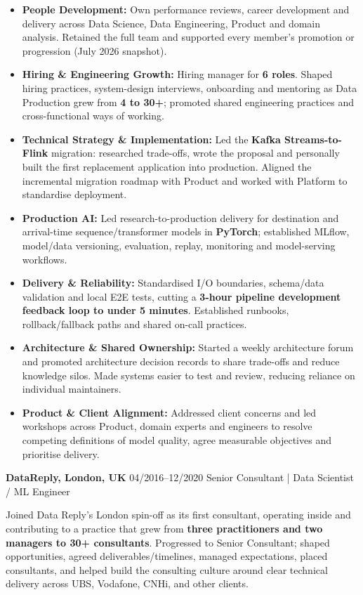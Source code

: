 \documentclass[]{../../../../friggeri-cv}
\renewcommand{\entry}[4]{%
  \parbox[t]{\dimexpr\textwidth-\entryleftinset\relax}{%
    \textbf{#2}%
    {\footnotesize\addfontfeature{Color=lightgray}\hspace{0.6em}#1}%
    \hfill%
    {\small\color{textcolor} #3}\\%
    #4\vspace{\parsep}%
  }\\}
\begin{document}
\begin{entrylist}
{{        }
        \begin{itemize}[leftmargin=1.1em]
            \item \footnotesize\textbf{People Development:} Own performance reviews, career development and delivery across Data Science, Data Engineering, Product and domain analysis. Retained the full team and supported every member's promotion or progression (July 2026 snapshot).
            \item \footnotesize\textbf{Hiring \& Engineering Growth:} Hiring manager for \textbf{6 roles}. Shaped hiring practices, system-design interviews, onboarding and mentoring as Data Production grew from \textbf{4 to 30+}; promoted shared engineering practices and cross-functional ways of working.
            \item \footnotesize\textbf{Technical Strategy \& Implementation:} Led the \textbf{Kafka Streams-to-Flink} migration: researched trade-offs, wrote the proposal and personally built the first replacement application into production. Aligned the incremental migration roadmap with Product and worked with Platform to standardise deployment.
            \item \footnotesize\textbf{Production AI:} Led research-to-production delivery for destination and arrival-time sequence/transformer models in \textbf{PyTorch}; established MLflow, model/data versioning, evaluation, replay, monitoring and model-serving workflows.
            \item \footnotesize\textbf{Delivery \& Reliability:} Standardised I/O boundaries, schema/data validation and local E2E tests, cutting a \textbf{3-hour pipeline development feedback loop to under 5 minutes}. Established runbooks, rollback/fallback paths and shared on-call practices.
            \item \footnotesize\textbf{Architecture \& Shared Ownership:} Started a weekly architecture forum and promoted architecture decision records to share trade-offs and reduce knowledge silos. Made systems easier to test and review, reducing reliance on individual maintainers.
            \item \footnotesize\textbf{Product \& Client Alignment:} Addressed client concerns and led workshops across Product, domain experts and engineers to resolve competing definitions of model quality, agree measurable objectives and prioritise delivery.

        \end{itemize}
    }
    \entry
    {04/2016--12/2020}
    {DataReply, London, UK}
    {Senior Consultant | Data Scientist / ML Engineer}
    {
        {\small
        \setlength{\parindent}{0pt}
        \setlength{\leftskip}{0pt}
        Joined Data Reply's London spin-off as its first consultant, operating inside and contributing to a practice that grew from \textbf{three practitioners and two managers to 30+ consultants}. Progressed to Senior Consultant; shaped opportunities, agreed deliverables/timelines, managed expectations, placed consultants, and helped build the consulting culture around clear technical delivery across UBS, Vodafone, CNHi, and other clients.

}}
\end{entrylist}
\end{document}
